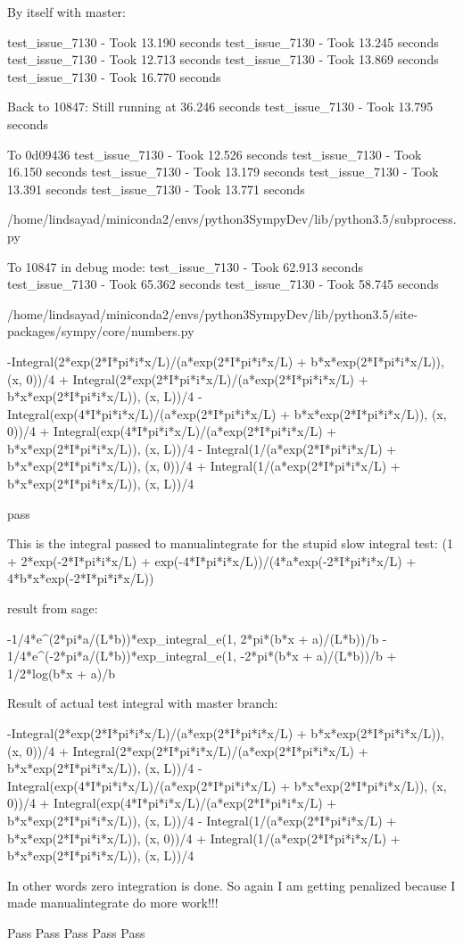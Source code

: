 By itself with master:

test_issue_7130 - Took 13.190 seconds
test_issue_7130 - Took 13.245 seconds
test_issue_7130 - Took 12.713 seconds
test_issue_7130 - Took 13.869 seconds
test_issue_7130 - Took 16.770 seconds

Back to 10847:
Still running at 36.246 seconds
test_issue_7130 - Took 13.795 seconds

To 0d09436
test_issue_7130 - Took 12.526 seconds
test_issue_7130 - Took 16.150 seconds
test_issue_7130 - Took 13.179 seconds
test_issue_7130 - Took 13.391 seconds
test_issue_7130 - Took 13.771 seconds

/home/lindsayad/miniconda2/envs/python3SympyDev/lib/python3.5/subprocess.py

To 10847 in debug mode:
test_issue_7130 - Took 62.913 seconds
test_issue_7130 - Took 65.362 seconds
test_issue_7130 - Took 58.745 seconds

/home/lindsayad/miniconda2/envs/python3SympyDev/lib/python3.5/site-packages/sympy/core/numbers.py

-Integral(2*exp(2*I*pi*i*x/L)/(a*exp(2*I*pi*i*x/L) + b*x*exp(2*I*pi*i*x/L)), (x, 0))/4 + Integral(2*exp(2*I*pi*i*x/L)/(a*exp(2*I*pi*i*x/L) + b*x*exp(2*I*pi*i*x/L)), (x, L))/4 - Integral(exp(4*I*pi*i*x/L)/(a*exp(2*I*pi*i*x/L) + b*x*exp(2*I*pi*i*x/L)), (x, 0))/4 + Integral(exp(4*I*pi*i*x/L)/(a*exp(2*I*pi*i*x/L) + b*x*exp(2*I*pi*i*x/L)), (x, L))/4 - Integral(1/(a*exp(2*I*pi*i*x/L) + b*x*exp(2*I*pi*i*x/L)), (x, 0))/4 + Integral(1/(a*exp(2*I*pi*i*x/L) + b*x*exp(2*I*pi*i*x/L)), (x, L))/4

pass

This is the integral passed to manualintegrate for the stupid slow integral test:
(1 + 2*exp(-2*I*pi*i*x/L) + exp(-4*I*pi*i*x/L))/(4*a*exp(-2*I*pi*i*x/L) + 4*b*x*exp(-2*I*pi*i*x/L))

result from sage:

-1/4*e^(2*pi*a/(L*b))*exp_integral_e(1, 2*pi*(b*x + a)/(L*b))/b - 1/4*e^(-2*pi*a/(L*b))*exp_integral_e(1, -2*pi*(b*x + a)/(L*b))/b + 1/2*log(b*x + a)/b

Result of actual test integral with master branch:

-Integral(2*exp(2*I*pi*i*x/L)/(a*exp(2*I*pi*i*x/L) + b*x*exp(2*I*pi*i*x/L)), (x, 0))/4 + Integral(2*exp(2*I*pi*i*x/L)/(a*exp(2*I*pi*i*x/L) + b*x*exp(2*I*pi*i*x/L)), (x, L))/4 - Integral(exp(4*I*pi*i*x/L)/(a*exp(2*I*pi*i*x/L) + b*x*exp(2*I*pi*i*x/L)), (x, 0))/4 + Integral(exp(4*I*pi*i*x/L)/(a*exp(2*I*pi*i*x/L) + b*x*exp(2*I*pi*i*x/L)), (x, L))/4 - Integral(1/(a*exp(2*I*pi*i*x/L) + b*x*exp(2*I*pi*i*x/L)), (x, 0))/4 + Integral(1/(a*exp(2*I*pi*i*x/L) + b*x*exp(2*I*pi*i*x/L)), (x, L))/4

In other words zero integration is done. So again I am getting penalized because I made manualintegrate do more work!!!

Pass
Pass
Pass
Pass
Pass



